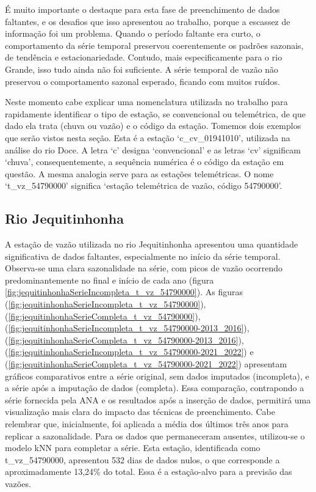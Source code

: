 É muito importante o destaque para esta fase de preenchimento de dados faltantes, e os desafios que isso apresentou ao trabalho, porque a escassez de informação foi um problema. Quando o período faltante era curto, o comportamento da série temporal preservou coerentemente os padrões sazonais, de tendência e estacionariedade. Contudo, mais especificamente para o rio Grande, isso tudo ainda não foi suficiente. A série temporal de vazão não preservou o comportamento sazonal esperado, ficando com muitos ruídos.

Neste momento cabe explicar uma nomenclatura utilizada no trabalho para rapidamente identificar o tipo de estação, se convencional ou telemétrica, de que dado ela trata (chuva ou vazão) e o código da estação. Tomemos dois exemplos que serão vistos nesta seção. Esta é a estação `c\_cv\_01941010', utilizada na análise do rio Doce. A letra `c' designa `convencional' e as letras `cv' significam `chuva', consequentemente, a sequência numérica é o código da estação em questão. A mesma analogia serve para as estações telemétricas. O nome `t\_vz\_54790000' significa `estação telemétrica de vazão, código 54790000'.

\subsection{Rio Jequitinhonha}

A estação de vazão utilizada no rio Jequitinhonha apresentou uma quantidade significativa de dados faltantes, especialmente no início da série temporal. Observa-se uma clara sazonalidade na série, com picos de vazão ocorrendo predominantemente no final e início de cada ano (figura \ref{fig:jequitinhonhaSerieIncompleta_t_vz_54790000}).
As figuras (\ref{fig:jequitinhonhaSerieIncompleta_t_vz_54790000}), (\ref{fig:jequitinhonhaSerieCompleta_t_vz_54790000}), (\ref{fig:jequitinhonhaSerieIncompleta_t_vz_54790000-2013_2016}), (\ref{fig:jequitinhonhaSerieCompleta_t_vz_54790000-2013_2016}), (\ref{fig:jequitinhonhaSerieIncompleta_t_vz_54790000-2021_2022}) e (\ref{fig:jequitinhonhaSerieCompleta_t_vz_54790000-2021_2022}) apresentam gráficos comparativos entre a série original, sem dados imputados (incompleta), e a série após a imputação de dados (completa). Essa comparação, contrapondo a série fornecida pela ANA e os resultados após a inserção de dados, permitirá uma visualização mais clara do impacto das técnicas de preenchimento. Cabe relembrar que, inicialmente, foi aplicada a média dos últimos três anos para replicar a sazonalidade. Para os dados que permaneceram ausentes, utilizou-se o modelo kNN para completar a série. Esta estação, identificada como t\_vz\_54790000, apresentou 532 dias de dados nulos, o que corresponde a aproximadamente 13,24\% do total. Essa é a estação-alvo para a previsão das vazões.

